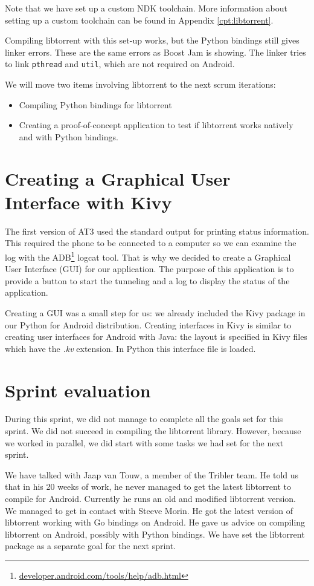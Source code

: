 		Note that we have set up a custom NDK toolchain. More information about setting up a custom toolchain can be found in Appendix \ref{cpt:libtorrent}.
		
		Compiling libtorrent with this set-up works, but the Python bindings still gives linker errors. These are the same errors as Boost Jam is showing. The linker tries to link \texttt{pthread} and \texttt{util}, which are not required on Android.
		
		We will move two items involving libtorrent to the next scrum iterations:
		\begin{itemize}
		\item Compiling Python bindings for libtorrent
		\item Creating a proof-of-concept application to test if libtorrent works natively and with Python bindings.
		\end{itemize}
	
	\section{Creating a Graphical User Interface with Kivy}
		The first version of AT3 used the standard output for printing status information. This required the phone to be connected to a computer so we can examine the log with the ADB\footnote{\href{http://developer.android.com/tools/help/adb.html}{developer.android.com/tools/help/adb.html}} logcat tool. That is why we decided to create a Graphical User Interface (GUI) for our application. The purpose of this application is to provide a button to start the tunneling and a log to display the status of the application.
	
		Creating a GUI was a small step for us: we already included the Kivy package in our Python for Android distribution. Creating interfaces in Kivy is similar to creating user interfaces for Android with Java: the layout is specified in Kivy files which have the \emph{.kv} extension. In Python this interface file is loaded.
	
	\section{Sprint evaluation}
		During this sprint, we did not manage to complete all the goals set for this sprint. We did not succeed in compiling the libtorrent library. However, because we worked in parallel, we did start with some tasks we had set for the next sprint.
		
		We have talked with Jaap van Touw, a member of the Tribler team. He told us that in his 20 weeks of work, he never managed to get the latest libtorrent to compile for Android.
		Currently he runs an old and modified libtorrent version. We managed to get in contact with Steeve Morin. He got the latest version of libtorrent working with Go bindings on Android. He gave us advice on compiling libtorrent on Android, possibly with Python bindings. We have set the libtorrent package as a separate goal for the next sprint.
